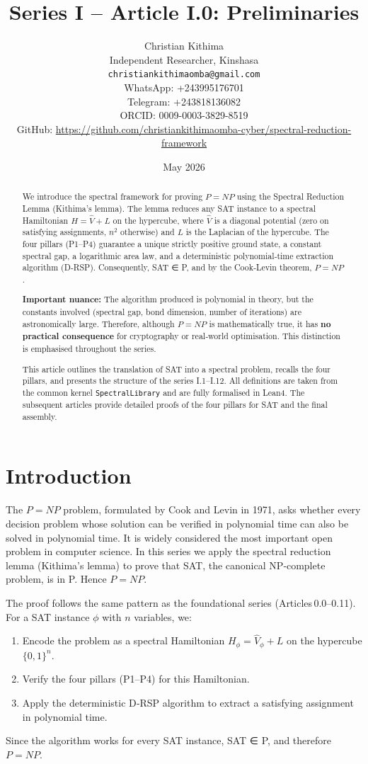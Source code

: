 \documentclass[11pt,a4paper]{article}
\title{Series I – Article I.0: Preliminaries}
\author{Christian Kithima \\
Independent Researcher, Kinshasa \\
\texttt{christiankithimaomba@gmail.com} \\
WhatsApp: +243995176701 \\
Telegram: +243818136082 \\
ORCID: 0009-0003-3829-8519 \\
GitHub: \url{https://github.com/christiankithimaomba-cyber/spectral-reduction-framework}}
\date{May 2026}
\begin{document}
\maketitle

\begin{abstract}
We introduce the spectral framework for proving \(P = NP\) using the Spectral Reduction Lemma (Kithima's lemma). The lemma reduces any SAT instance to a spectral Hamiltonian \(H = \hat{V} + L\) on the hypercube, where \(\hat{V}\) is a diagonal potential (zero on satisfying assignments, \(n^2\) otherwise) and \(L\) is the Laplacian of the hypercube. The four pillars (P1–P4) guarantee a unique strictly positive ground state, a constant spectral gap, a logarithmic area law, and a deterministic polynomial‑time extraction algorithm (D‑RSP). Consequently, SAT ∈ P, and by the Cook‑Levin theorem, \(P = NP\). 

\textbf{Important nuance:} The algorithm produced is polynomial in theory, but the constants involved (spectral gap, bond dimension, number of iterations) are astronomically large. Therefore, although \(P = NP\) is mathematically true, it has \textbf{no practical consequence} for cryptography or real‑world optimisation. This distinction is emphasised throughout the series.

This article outlines the translation of SAT into a spectral problem, recalls the four pillars, and presents the structure of the series I.1–I.12. All definitions are taken from the common kernel \texttt{SpectralLibrary} and are fully formalised in Lean4. The subsequent articles provide detailed proofs of the four pillars for SAT and the final assembly.
\end{abstract}

\tableofcontents

\section{Introduction}

The \(P = NP\) problem, formulated by Cook and Levin in 1971, asks whether every decision problem whose solution can be verified in polynomial time can also be solved in polynomial time. It is widely considered the most important open problem in computer science. In this series we apply the spectral reduction lemma (Kithima's lemma) to prove that SAT, the canonical NP‑complete problem, is in P. Hence \(P = NP\).

The proof follows the same pattern as the foundational series (Articles 0.0–0.11). For a SAT instance \(\phi\) with \(n\) variables, we:
\begin{enumerate}
\item Encode the problem as a spectral Hamiltonian \(H_\phi = \hat{V}_\phi + L\) on the hypercube \(\{0,1\}^n\).
\item Verify the four pillars (P1–P4) for this Hamiltonian.
\item Apply the deterministic D‑RSP algorithm to extract a satisfying assignment in polynomial time.
\end{enumerate}
Since the algorithm works for every SAT instance, SAT ∈ P, and therefore \(P = NP\).
\end{document}

